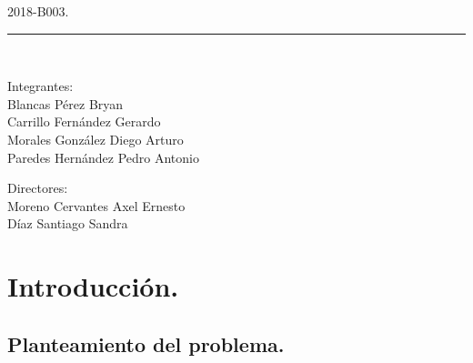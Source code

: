 \documentclass[12pt, a4paper, titlepage]{article}
\begin{document}
\begin{titlepage}
\begin{center}
			\begin{large}
				2018-B003.\\
			\end{large}
			
			\vspace*{0.2in}
			
			\rule{80mm}{.1mm}\\
			\vspace*{0.1in}
			
			\begin{large}
				\begin{center}
					Integrantes:\\
					Blancas Pérez Bryan\\
					Carrillo Fernández Gerardo\\
					Morales González Diego Arturo\\
					Paredes Hernández Pedro Antonio\\
				\end{center}
			\end{large}
			
			\begin{large}
				Directores:\\
				Moreno Cervantes Axel Ernesto\\
				Díaz Santiago Sandra\\
			\end{large}
			
		\end{center}
	
	\end{titlepage}

	\begin{appendix}
		\href{}{\renewcommand*\contentsname{{\textcolor{azulescom}{Índice.}}}}
		\tableofcontents
		\newpage
		\renewcommand*\listfigurename{{\textcolor{azulescom}{Índice de figuras.}}}
		\listoffigures
		\newpage
		\newpage
		\renewcommand*\listtablename{{\textcolor{azulescom}{Índice de cuadros.}}}
		\listoftables
	\end{appendix}
	\newpage
	

	\section{\textcolor{azulescom}{Introducción.}}
		\subsection{Planteamiento del problema.}
\end{document}

